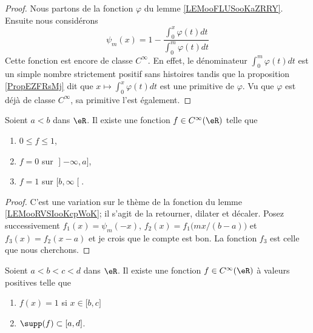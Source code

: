 \begin{proof}
	Nous partons de la fonction \( \varphi\) du lemme \ref{LEMooFLUSooKaZRRY}. Ensuite nous considérons
	\begin{equation}
		\psi_m(x)=1-\frac{ \int_0^x \varphi(t)dt }{ \int_0^m\varphi(t)dt}
	\end{equation}
	Cette fonction est encore de classe \(  C^{\infty}\). En effet, le dénominateur \( \int_0^m\varphi(t)dt\) est un simple nombre strictement positif sans histoires tandis que la proposition \ref{PropEZFRsMj} dit que \( x\mapsto \int_0^x\varphi(t)dt\) est une primitive de \( \varphi\). Vu que \( \varphi\) est déjà de classe \(  C^{\infty}\), sa primitive l'est également.
\end{proof}

\begin{lemma}     \label{LEMooFFPVooDKGUAp}
	Soient \( a<b\) dans \( \eR\). Il existe une fonction \( f\in  C^{\infty}(\eR)\) telle que
	\begin{enumerate}
		\item
		      \( 0\leq f\leq 1\),
		\item
		      \( f=0\) sur \( \mathopen] -\infty , a \mathclose]\),
		\item
		      \( f=1\) sur \( \mathopen[ b , \infty \mathclose[\).
	\end{enumerate}
\end{lemma}

\begin{proof}
	C'est une variation sur le thème de la fonction du lemme \ref{LEMooRVSIooKcpWoK}; il s'agit de la retourner, dilater et décaler. Posez successivement \( f_1(x)=\psi_m(-x)\), \( f_2(x)=f_1\big(mx/(b-a)\big)\) et \( f_3(x)=f_2(x-a)\) et je crois que le compte est bon. La fonction \( f_3\) est celle que nous cherchons.
\end{proof}

\begin{proposition}     \label{PROPooAZJZooTYWjzb}
	Soient \( a<b<c<d\) dans \( \eR\). Il existe une fonction \( f\in C^{\infty}(\eR)\) à valeurs positives telle que
	\begin{enumerate}
		\item
		      \( f(x)=1\) si \( x\in\mathopen[ b , c \mathclose]\)
		\item
		      \( \supp(f)\subset\mathopen[ a , d \mathclose]\).
	\end{enumerate}
\end{proposition}

